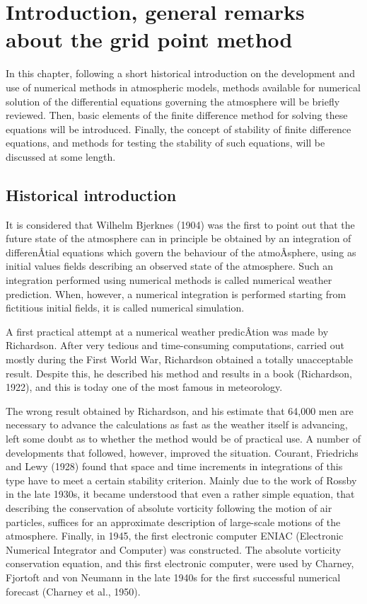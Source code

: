 \section{Introduction, general remarks about the grid point
method}\label{Chapter1}

In this chapter, following a short historical introduction on the
development and use of numerical methods in atmospheric models, methods
available for numerical solution of the differential equations governing
the atmosphere will be briefly reviewed. Then, basic elements of the
finite difference method for solving these equations will be introduced.
Finally, the concept of stability of finite difference equations, and
methods for testing the stability of such equations, will be discussed
at some length.

\subsection{\texorpdfstring{\textbf{Historical
introduction}}{Historical introduction}}\label{historical-introduction}

It is considered that Wilhelm Bjerknes (1904) was the first to point out
that the future state of the atmosphere can in principle be obtained by
an integration of differenÂ­tial equations which govern the behaviour of
the atmoÂ­sphere, using as initial values fields describing an observed
state of the atmosphere. Such an integration performed using numerical
methods is called numerical weather prediction. When, however, a
numerical integration is performed starting from fictitious initial
fields, it is called numerical simulation.

A first practical attempt at a numerical weather predicÂ­tion was made by
Richardson. After very tedious and time-consuming computations, carried
out mostly during the First World War, Richardson obtained a totally
unacceptable result. Despite this, he described his method and results
in a book (Richardson, 1922), and this is today one of the most famous
in meteorology.

The wrong result obtained by Richardson, and his estimate that 64,000
men are necessary to advance the calculations as fast as the weather
itself is advancing, left some doubt as to whether the method would be
of practical use. A number of developments that followed, however,
improved the situation. Courant, Friedrichs and Lewy (1928) found that
space and time increments in integrations of this type have to meet a
certain stability criterion. Mainly due to the work of Rossby in the
late 1930\textquotesingle s, it became understood that even a rather
simple equation, that describing the conservation of absolute vorticity
following the motion of air particles, suffices for an approximate
description of large-scale motions of the atmosphere. Finally, in 1945,
the first electronic computer ENIAC (Electronic Numerical Integrator and
Computer) was constructed. The absolute vorticity conservation equation,
and this first electronic computer, were used by Charney, Fjortoft and
von Neumann in the late 1940\textquotesingle s for the first successful
numerical forecast (Charney et al., 1950).

